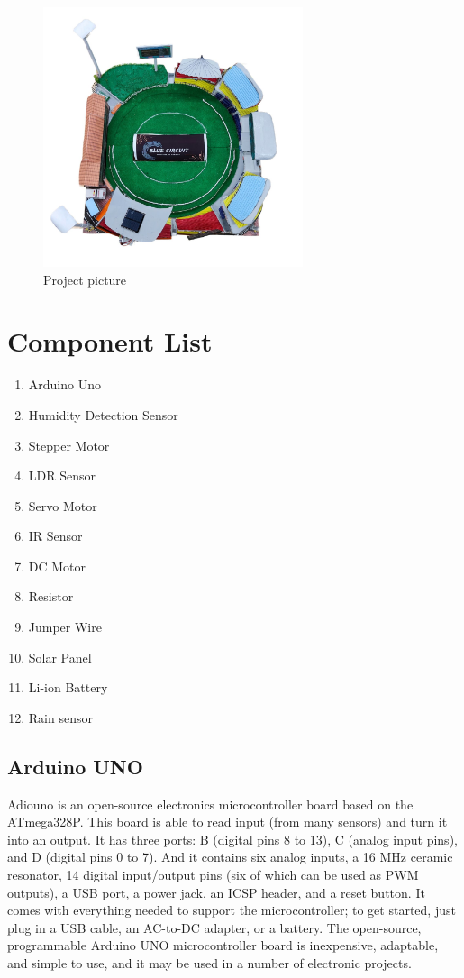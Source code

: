 \documentclass[conference]{IEEEtran}
\begin{document}
\begin{figure}
    \centering
    \includegraphics[width=3in]{BlueCircuit.jpg}
    \caption{Project picture}
    \label{fig:ultrasonicl}
\end{figure}

\section{Component List}


\begin{enumerate}
    \item Arduino Uno
    \item Humidity Detection Sensor
    \item  Stepper Motor
    \item LDR Sensor
    \item Servo Motor
    \item IR Sensor
    \item DC Motor
    \item Resistor
    \item Jumper Wire
    \item Solar Panel
    \item Li-ion Battery
    \item Rain sensor
\end{enumerate}

\subsection{Arduino UNO}

 Adiouno is an open-source electronics microcontroller board based on the ATmega328P. This board is able to read input (from many sensors) and turn it into an output. It has three ports: B (digital pins 8 to 13), C (analog input pins), and D (digital pins 0 to 7). And it contains six analog inputs, a 16 MHz ceramic resonator, 14 digital input/output pins (six of which can be used as PWM outputs), a USB port, a power jack, an ICSP header, and a reset button. It comes with everything needed to support the microcontroller; to get started, just plug in a USB cable, an AC-to-DC adapter, or a battery. The open-source, programmable Arduino UNO microcontroller board is inexpensive, adaptable, and simple to use, and it may be used in a number of electronic projects.
 
\end{document}

